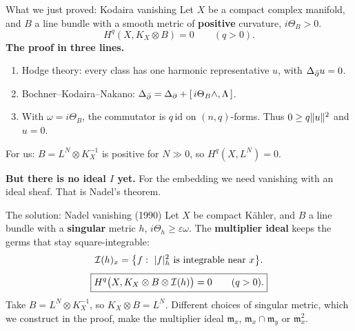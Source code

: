 \begin{frame}{What we just proved: Kodaira vanishing}
\label{fr:what-we-just-proved-29}
Let \(X\) be a compact complex manifold, and \(B\) a line bundle with a smooth metric of \textbf{positive} curvature, \(i\Theta_B>0\).
\[
\boxed{H^q(X,K_X\otimes B)=0\qquad(q>0).}
\]
\textbf{The proof in three lines.}
\begin{enumerate}
\item Hodge theory: every class has one harmonic representative \(u\), with \(\Delta_{\bar\partial}u=0\).
\item Bochner--Kodaira--Nakano: \(\Delta_{\bar\partial}=\Delta_{\partial}+[\,i\Theta_B\wedge,\Lambda\,]\).
\item With \(\omega=i\Theta_B\), the commutator is \(q\,\mathrm{id}\) on \((n,q)\)-forms. Thus \(0\ge q\lVert u\rVert^2\) and \(u=0\).
\end{enumerate}
\par\medskip
For us: \(B=L^N\otimes K_X^{-1}\) is positive for \(N\gg0\), so \(H^q(X,L^N)=0\).
\par\medskip
\textbf{But there is no ideal \(I\) yet.} For the embedding we need vanishing with an ideal sheaf. That is Nadel's theorem.
\end{frame}

\begin{frame}{The solution: Nadel vanishing (1990)}
Let \(X\) be compact Kähler, and \(B\) a line bundle with a \textbf{singular} metric \(h\), \(i\Theta_h\ge\varepsilon\omega\).
The \textbf{multiplier ideal} keeps the germs that stay square-integrable:
\[
\cI(h)_x=\bigl\{f:\ |f|_h^2\ \text{is integrable near}\ x\bigr\}.
\]
\[
\boxed{H^q\bigl(X,K_X\otimes B\otimes\mathcal I(h)\bigr)=0\qquad(q>0).}
\]
Take \(B=L^N\otimes K_X^{-1}\), so \(K_X\otimes B=L^N\).
Different choices of singular metric, which we construct in the proof, make the multiplier ideal
\(\mathfrak m_x\), \(\mathfrak m_x\cap\mathfrak m_y\) or \(\mathfrak m_x^2\).
\end{frame}


